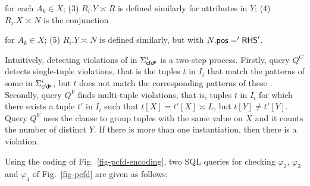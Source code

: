{\noindent for each $A_{k} \in X$; (3) $R_i.Y\asymp R$ is defined similarly for attributes in $Y$; (4) $R_i.X\asymp N$ is the conjunction

\begin{footnotesize}
\end{footnotesize}

\noindent for $A_{k} \in X$; (5) $R_i.Y\asymp N$ is defined similarly, but with $N.\protect\mathsf{pos}='{\mathsf{RHS}}'$.

Intuitively, detecting violations of \pCFDs in $\Sigma_{{\mathsf{cfd^p}}}^i$ is a two-step process. Firstly, query $Q^{C}$ detects single-tuple violations, that is the tuples $t$ in $I_{i}$ that match the \LHS patterns of some \pCFDs in $\Sigma_{{\mathsf{cfd^p}}}^i$, but $t$ does not match the corresponding \RHS patterns of these \pCFDs. Secondly, query $Q^{V}$ finds multi-tuple violations, that is, tuples $t$ in $I_{i}$ for which there exists a tuple $t'$ in $I_{i}$ such that $t[X]=t'[X] \asymp L$, but $t[Y] \neq t'[Y]$. Query $Q^{V}$ uses the  clause to group tuples with the same value on $X$ and it counts the number of distinct $Y$. If there is more than one instantiation, then there is a violation.

\begin{example}\label{exa-cfd-query} Using the coding of Fig.~\ref{fig-pcfd-encoding}, two SQL queries for checking \pCFDs $\varphi_2$, $\varphi_3$ and $\varphi_4$ of Fig.~\ref{fig-pcfd} are given as follows:

\begin{footnotesize}
\end{footnotesize}
\end{example}}
